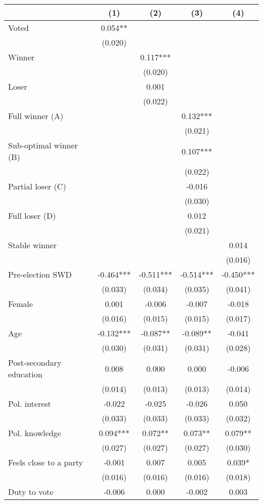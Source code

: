 \begin{table}
\centering
\begin{tabular}[t]{lcccc}
\toprule
  & (1) & (2) & (3) & (4)\\
\midrule
Voted & 0.054** &  &  & \\
 & (0.020) &  &  & \\
Winner &  & 0.117*** &  & \\
 &  & (0.020) &  & \\
Loser &  & 0.001 &  & \\
 &  & (0.022) &  & \\
Full winner (A) &  &  & 0.132*** & \\
 &  &  & (0.021) \vphantom{1} & \\
Sub-optimal winner (B) &  &  & 0.107*** & \\
 &  &  & (0.022) & \\
Partial loser (C) &  &  & -0.016 & \\
 &  &  & (0.030) & \\
Full loser (D) &  &  & 0.012 & \\
 &  &  & (0.021) & \\
Stable winner &  &  &  & 0.014\\
 &  &  &  & (0.016)\\
Pre-election SWD & -0.464*** & -0.511*** & -0.514*** & -0.450***\\
 & (0.033) & (0.034) & (0.035) & (0.041)\\
Female & 0.001 & -0.006 & -0.007 & -0.018\\
 & (0.016) & (0.015) & (0.015) & (0.017)\\
Age & -0.132*** & -0.087** & -0.089** & -0.041\\
 & (0.030) & (0.031) & (0.031) & (0.028)\\
Post-secondary education & 0.008 & 0.000 & 0.000 & -0.006\\
 & (0.014) & (0.013) & (0.013) & (0.014)\\
Pol. interest & -0.022 & -0.025 & -0.026 & 0.050\\
 & (0.033) & (0.033) & (0.033) & (0.032)\\
Pol. knowledge & 0.094*** & 0.072** & 0.073** & 0.079**\\
 & (0.027) & (0.027) & (0.027) & (0.030)\\
Feels close to a party & -0.001 & 0.007 & 0.005 & 0.039*\\
 & (0.016) & (0.016) & (0.016) & (0.018)\\
Duty to vote & -0.006 & 0.000 & -0.002 & 0.003\\

\end{tabular}
\end{table}
